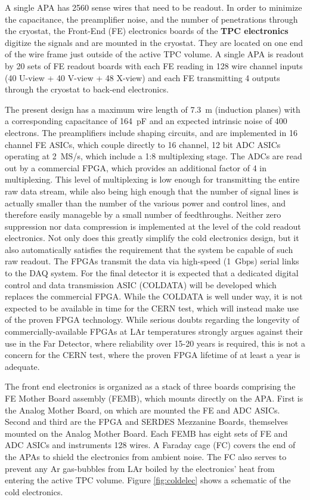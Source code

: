 A single APA has 2560 sense wires that need to be readout.  In order to minimize the capacitance, the preamplifier noise, and the number of penetrations through the cryostat, the Front-End (FE) electronics boards of the {\bf TPC electronics} digitize the signals and 
are mounted in the cryostat.  They are located on one end of the wire frame just outside of the active TPC volume.  A single APA is readout by 20 sets of FE readout boards with each FE reading in 128 wire channel inputs (40 U-view + 40 V-view + 48 X-view) and each FE transmitting 4 outputs through the cryostat to back-end electronics.
 
The present design has a maximum wire length of 7.3~m (induction planes)
with a corresponding capacitance of 164~pF and an expected intrinsic noise of 400 electrons.
The preamplifiers include shaping circuits, and are implemented in 16 channel FE ASICs, which couple directly to 16 channel, 12 bit ADC ASICs operating at 2~MS/s, which include a 1:8 multiplexing stage.
The ADCs are read out by a commercial FPGA, which provides an additional factor of 4 in multiplexing.
This level of multiplexing is low enough for transmitting the entire raw data stream,
while also being high enough that the number of signal lines is actually smaller than the number of the various
power and control lines, and therefore easily manageble by a small number of feedthroughs.
Neither zero suppression nor data compression is implemented at the level of the cold readout electronics.
Not only does this greatly simplify the cold electronics design,
but it also automatically satisfies the requirement that the system be capable of such raw readout.
The FPGAs transmit the data via high-speed (1~Gbps) serial links to the DAQ system.
For the final detector it is expected that a dedicated digital control and data transmission ASIC (COLDATA) will be developed which
replaces the commercial FPGA.
While the COLDATA is well under way, it is not expected to be available in time for the CERN test,
which will instead make use of the proven FPGA technology.
While serious doubts regarding the longevity of commercially-available FPGAs at LAr temperatures strongly argues against
their use in the Far Detector, where reliability over 15-20 years is required,
this is not a concern for the CERN test, where the proven FPGA lifetime of at least a year is adequate.

The front end electronics is organized as a stack of three boards comprising the FE Mother Board assembly (FEMB),
which mounts directly on the APA.
First is the Analog Mother Board, on which are mounted the FE and ADC ASICs.
Second and third are the FPGA and SERDES Mezzanine Boards, themselves mounted on the Analog Mother Board.
Each FEMB has eight sets of FE and ADC ASICs and instruments 128 wires.
A Faraday cage (FC) covers the end of the APAs to shield the electronics from ambient noise.
The FC also serves to prevent any Ar gas-bubbles from LAr boiled by the electronics' heat from entering the active TPC volume.
Figure \ref{fig:coldelec} shows a schematic of the cold electronics. 

